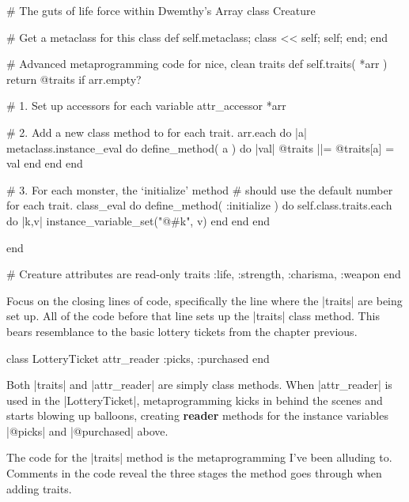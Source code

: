 \documentclass[12pt,twoside]{report}
\begin{document}
\begin{rubycode}

 # The guts of life force within Dwemthy's Array
 class Creature

   # Get a metaclass for this class
   def self.metaclass; class << self; self; end; end

   # Advanced metaprogramming code for nice, clean traits
   def self.traits( *arr )
     return @traits if arr.empty?

     # 1. Set up accessors for each variable
     attr_accessor *arr

     # 2. Add a new class method to for each trait.
     arr.each do |a|
       metaclass.instance_eval do
         define_method( a ) do |val|
           @traits ||= {}
           @traits[a] = val
         end
       end
     end

     # 3. For each monster, the `initialize' method
     #    should use the default number for each trait.
     class_eval do
       define_method( :initialize ) do
         self.class.traits.each do |k,v|
           instance_variable_set("@#{k}", v)
         end
       end
     end

   end

   # Creature attributes are read-only
   traits :life, :strength, :charisma, :weapon
 end

\end{rubycode}


Focus on the closing lines of code, specifically the line where the
\rubyinline|traits| are being set up.  All of the code
before that line sets up the \rubyinline|traits| class
method.  This bears resemblance to the basic lottery tickets from the
chapter previous.


\begin{rubycode}

 class LotteryTicket
   attr_reader :picks, :purchased
 end

\end{rubycode}


Both \rubyinline|traits| and
\rubyinline|attr_reader| are simply class methods.
When \rubyinline|attr_reader| is used in the
\rubyinline|LotteryTicket|, metaprogramming kicks in
behind the scenes and starts blowing up balloons, creating {\bf
  reader} methods for the instance variables
\rubyinline|@picks| and
\rubyinline|@purchased| above.

The code for the \rubyinline|traits| method is the
metaprogramming I've been alluding to. Comments in the code reveal the
three stages the method goes through when adding traits.
\end{document}
